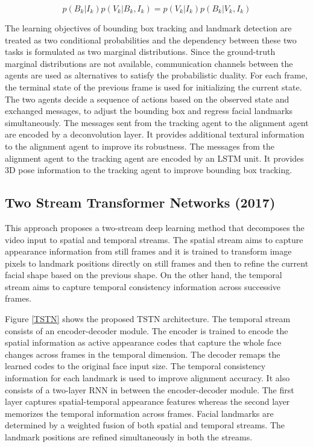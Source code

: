\documentclass{llncs}
\begin{document}
\begin{equation}
p\left(B_{k} | I_{k}\right) p\left(V_{k} | B_{k}, I_{k}\right)=p\left(V_{k} | I_{k}\right) p\left(B_{k} | V_{k}, I_{k}\right)
\end{equation}



The learning objectives of bounding box tracking and landmark detection are treated as two conditional probabilities and the dependency between these two tasks is formulated as two marginal distributions. Since the ground-truth marginal distributions are not available, communication channels between the agents are used as alternatives to satisfy the probabilistic duality. For each frame, the terminal state of the previous frame is used for initializing the current state. The two agents decide a sequence of actions based on the observed state and exchanged messages, to adjust the bounding box and regress facial landmarks simultaneously. The messages sent from the tracking agent to the alignment agent are encoded by a deconvolution layer. It provides additional textural information to the alignment agent to improve its robustness. The messages from the alignment agent to the tracking agent are encoded by an LSTM unit. It provides 3D pose information to the tracking agent to improve bounding box tracking.

\subsection{Two Stream Transformer Networks (2017) \cite{tstn}}
This approach proposes a two-stream deep learning method that decomposes the video input to spatial and temporal streams. The spatial stream aims to capture appearance information from still frames and it is trained to transform image pixels to landmark positions directly on still frames and then to refine the current facial shape based on the previous shape. On the other hand, the temporal stream aims to capture temporal consistency information across successive frames. 

Figure \ref{TSTN} shows the proposed TSTN architecture. The temporal stream consists of an encoder-decoder module. The encoder is trained to encode the spatial information as active appearance codes that capture the whole face changes across frames in the temporal dimension. The decoder remaps the learned codes to the original face input size. The temporal consistency information for each landmark is used to improve alignment accuracy. It also consists of a two-layer RNN in between the encoder-decoder module. The first layer captures spatial-temporal appearance features whereas the second layer memorizes the temporal information across frames. Facial landmarks are determined by a weighted fusion of both spatial and temporal streams. The landmark positions are refined simultaneously in both the streams.
\end{document}

